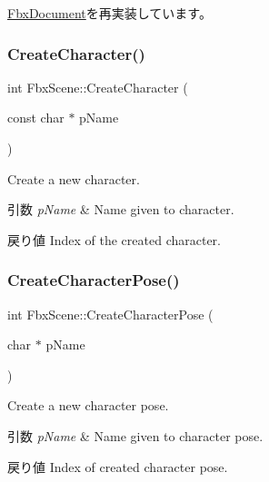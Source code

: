 \hyperlink{class_fbx_document_a6a345cc64e4ee39a6fd719b56d50dfac}{Fbx\+Document}を再実装しています。

\mbox{\label{class_fbx_scene_a5095a3dbd1407bda6c12e5aa29f63049}} 
\subsubsection{\texorpdfstring{Create\+Character()}{CreateCharacter()}}
{\footnotesize\ttfamily int Fbx\+Scene\+::\+Create\+Character (\begin{DoxyParamCaption}\item[{const char $\ast$}]{p\+Name }\end{DoxyParamCaption})}

Create a new character. 
\begin{DoxyParams}{引数}
{\em p\+Name} & Name given to character. \\
\hline
\end{DoxyParams}
\begin{DoxyReturn}{戻り値}
Index of the created character. 
\end{DoxyReturn}
\mbox{\label{class_fbx_scene_aec8727602ce4d2a91448cc42c083e5a3}} 
\subsubsection{\texorpdfstring{Create\+Character\+Pose()}{CreateCharacterPose()}}
{\footnotesize\ttfamily int Fbx\+Scene\+::\+Create\+Character\+Pose (\begin{DoxyParamCaption}\item[{char $\ast$}]{p\+Name }\end{DoxyParamCaption})}

Create a new character pose. 
\begin{DoxyParams}{引数}
{\em p\+Name} & Name given to character pose. \\
\hline
\end{DoxyParams}
\begin{DoxyReturn}{戻り値}
Index of created character pose. 
\end{DoxyReturn}
\mbox{\label{class_fbx_scene_a1496eb0d5cdc26a33f1da631fbc1f047}} 
